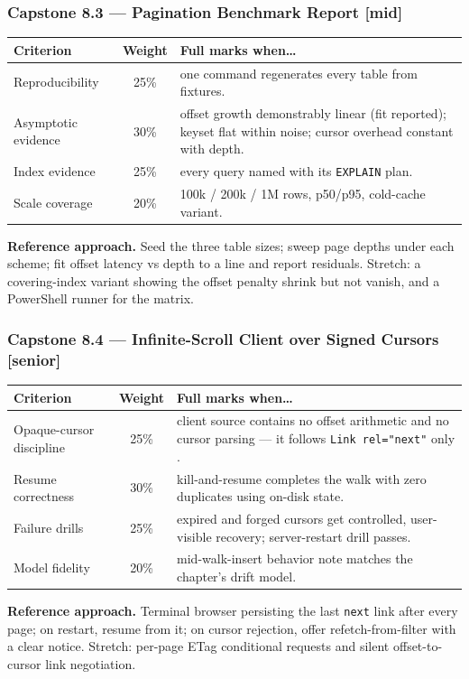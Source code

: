 \subsubsection*{Capstone 8.3 --- Pagination Benchmark Report [mid]}
\begin{center}\small
\begin{tabularx}{\textwidth}{l c X}
\toprule
\textbf{Criterion} & \textbf{Weight} & \textbf{Full marks when\ldots} \\
\midrule
Reproducibility & 25\% & one command regenerates every table from fixtures. \\
Asymptotic evidence & 30\% & offset growth demonstrably linear (fit reported); keyset flat within noise; cursor overhead constant with depth. \\
Index evidence & 25\% & every query named with its \texttt{EXPLAIN} plan. \\
Scale coverage & 20\% & 100k / 200k / 1M rows, p50/p95, cold-cache variant. \\
\bottomrule
\end{tabularx}
\end{center}
\textbf{Reference approach.} Seed the three table sizes; sweep page depths
under each scheme; fit offset latency vs depth to a line and report
residuals. Stretch: a covering-index variant showing the offset penalty
shrink but not vanish, and a PowerShell runner for the matrix.

\subsubsection*{Capstone 8.4 --- Infinite-Scroll Client over Signed Cursors [senior]}
\begin{center}\small
\begin{tabularx}{\textwidth}{l c X}
\toprule
\textbf{Criterion} & \textbf{Weight} & \textbf{Full marks when\ldots} \\
\midrule
Opaque-cursor discipline & 25\% & client source contains no offset arithmetic and no cursor parsing --- it follows \texttt{Link rel="next"} only \cite{rfc8288}. \\
Resume correctness & 30\% & kill-and-resume completes the walk with zero duplicates using on-disk state. \\
Failure drills & 25\% & expired and forged cursors get controlled, user-visible recovery; server-restart drill passes. \\
Model fidelity & 20\% & mid-walk-insert behavior note matches the chapter's drift model. \\
\bottomrule
\end{tabularx}
\end{center}
\textbf{Reference approach.} Terminal browser persisting the last
\texttt{next} link after every page; on restart, resume from it; on cursor
rejection, offer refetch-from-filter with a clear notice. Stretch: per-page
ETag conditional requests and silent offset-to-cursor link negotiation.

